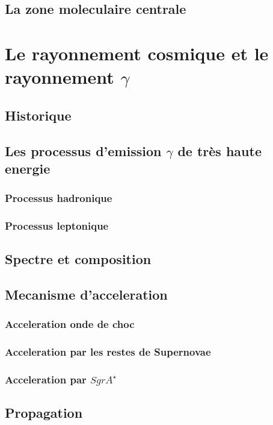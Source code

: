 \documentclass[12pt]{report}
\begin{document}
\section{La zone moleculaire centrale}

\chapter{Le rayonnement cosmique et le rayonnement $\gamma$}
\section{Historique}
\section{Les processus d'emission $\gamma$ de très haute energie}

\subsection{Processus hadronique}

\subsection{Processus leptonique}
\section{Spectre et composition}
\section{Mecanisme d'acceleration}
\subsection{Acceleration onde de choc}
\subsection{Acceleration par les restes de Supernovae}
\subsection{Acceleration par $SgrA^\star$}

\section{Propagation}
\end{document}
